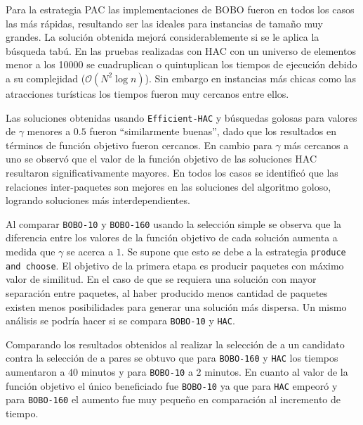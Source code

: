 Para la estrategia PAC las implementaciones de BOBO fueron en todos los casos las más rápidas, resultando ser las ideales para instancias de tamaño muy grandes. La solución obtenida mejorá considerablemente si se le aplica la búsqueda tabú. En las pruebas realizadas con HAC con un universo de elementos menor a los 10000 se cuadruplican o quintuplican los tiempos de ejecución debido a su complejidad ($\mathcal{O}(N^{2}\log n)$). Sin embargo en instancias más chicas como las atracciones turísticas los tiempos fueron muy cercanos entre ellos.

Las soluciones obtenidas usando \texttt{Efficient-HAC} y búsquedas golosas para valores de $\gamma$ menores a $0.5$ fueron \textquotedblleft similarmente buenas\textquotedblright , dado que los resultados en términos de función objetivo fueron cercanos. En cambio para $\gamma$ más cercanos a uno se observó que el valor de la función objetivo de las soluciones HAC resultaron significativamente mayores. En todos los casos se identificó que las relaciones inter-paquetes son mejores en las soluciones del algoritmo goloso, logrando soluciones más interdependientes.

Al comparar \texttt{BOBO-10} y \texttt{BOBO-160} usando la selección simple se observa que la diferencia entre los valores de la función objetivo de cada solución aumenta a medida que $\gamma$ se acerca a $1$. Se supone que esto se debe a la estrategia \texttt{produce and choose}. El objetivo de la primera etapa es producir paquetes con máximo valor de similitud. En el caso de que se requiera una solución con mayor separación entre paquetes, al haber producido menos cantidad de paquetes existen menos posibilidades para generar una solución más dispersa. Un mismo análisis se podría hacer si se compara \texttt{BOBO-10} y \texttt{HAC}.

Comparando los resultados obtenidos al realizar la selección de a un candidato contra la selección de a pares se obtuvo que para \texttt{BOBO-160} y \texttt{HAC} los tiempos aumentaron a $40$ minutos y para \texttt{BOBO-10} a $2$ minutos. En cuanto al valor de la función objetivo el único beneficiado fue \texttt{BOBO-10} ya que para \texttt{HAC} empeoró y para \texttt{BOBO-160} el aumento fue muy pequeño en comparación al incremento de tiempo.